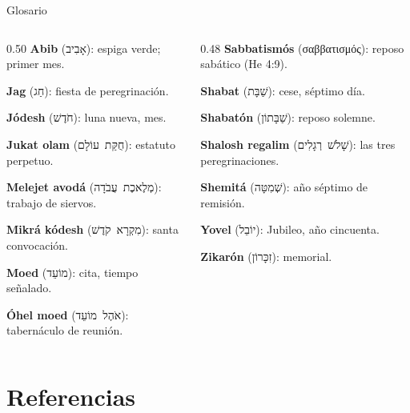 \documentclass[hyperref={bookmarks=false},aspectratio=169]{beamer}
\newcommand{\heb}[1]{\mbox{\foreignlanguage{hebrew}{#1}}}
\newcommand{\grc}[1]{\foreignlanguage{ancientgreek}{#1}}
\begin{document}
\begin{frame}{Glosario}
\begin{columns}[t,onlytextwidth]
\begin{column}{0.50\textwidth}\scriptsize
\textbf{Abib} (\heb{אָבִיב}): espiga verde; primer mes.\par
\textbf{Jag} (\heb{חַג}): fiesta de peregrinación.\par
\textbf{Jódesh} (\heb{חֹדֶשׁ}): luna nueva, mes.\par
\textbf{Jukat olam} (\heb{חֻקַּת עוֹלָם}): estatuto perpetuo.\par
\textbf{Melejet avodá} (\heb{מְלֶאכֶת עֲבֹדָה}): trabajo de siervos.\par
\textbf{Mikrá kódesh} (\heb{מִקְרָא קֹדֶשׁ}): santa convocación.\par
\textbf{Moed} (\heb{מוֹעֵד}): cita, tiempo señalado.\par
\textbf{Óhel moed} (\heb{אֹהֶל מוֹעֵד}): tabernáculo de reunión.
\end{column}
\begin{column}{0.48\textwidth}\scriptsize
\textbf{Sabbatismós} (\grc{σαββατισμός}): reposo sabático (He 4:9).\par
\textbf{Shabat} (\heb{שַׁבָּת}): cese, séptimo día.\par
\textbf{Shabatón} (\heb{שַׁבָּתוֹן}): reposo solemne.\par
\textbf{Shalosh regalim} (\heb{שָׁלֹשׁ רְגָלִים}): las tres peregrinaciones.\par
\textbf{Shemitá} (\heb{שְׁמִטָּה}): año séptimo de remisión.\par
\textbf{Yovel} (\heb{יוֹבֵל}): Jubileo, año cincuenta.\par
\textbf{Zikarón} (\heb{זִכָּרוֹן}): memorial.
\end{column}
\end{columns}
\end{frame}

\section{Referencias}
\end{document}
